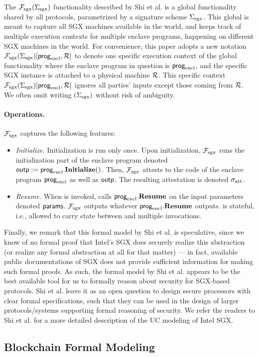The $\mathcal{F}_{\textrm{sgx}}({\Sigma_{\textrm{sgx}}})$ functionality described by Shi et al. 
is a global functionality shared by all protocols, parametrized
by a signature scheme ${\Sigma_{\textrm{sgx}}}$.
This global \fsgx 
is meant to capture all SGX machines available in the world,
and keeps track of 
multiple execution contexts
for multiple enclave programs, happening on different SGX machines in the world.
For convenience, 
this paper adopts a new notation
$\mathcal{F}_{\textrm{sgx}}({\Sigma_{\textrm{sgx}}})[{\sf prog}_{\textrm{encl}}, \mathcal{R}]$
to denote 
one specific execution context of the global \fsgx
functionality where the enclave program in question is ${\sf prog}_{\textrm{encl}}$,
and the specific SGX instance is attached to a physical machine $\mathcal{R}$.
This specific context 
$\mathcal{F}_{\textrm{sgx}}({\Sigma_{\textrm{sgx}}})[{\sf prog}_{\textrm{encl}}, \mathcal{R}]$
ignores all parties' inputs except those coming from $\mathcal{R}$.
We often omit writing $({\Sigma_{\textrm{sgx}}})$ without risk of ambiguity.


\paragraph{Operations.}
$\mathcal{F}_{\textrm{sgx}}$ captures the following features:
\begin{itemize}[leftmargin=5mm]
\item
{\it Initialize.}
Initialization is run only once.
Upon initialization, $\mathcal{F}_{\textrm{sgx}}$
runs the initialization part of the enclave program
denoted ${\sf outp} := {\sf prog}_{\textrm{encl}}.{\bf Initialize}()$.
Then, $\mathcal{F}_{\textrm{sgx}}$ 
attests to the code of the enclave program ${\sf prog}_{\textrm{encl}}$ 
as well as ${\sf outp}$.
The resulting attestation is denoted 
${\sigma_{\textrm{att}}}$.
\item
{\it Resume.}
When  is invoked,
\fsgx 
calls ${\sf prog}_{\textrm{encl}}.{\bf Resume}$
on the input parameters denoted ${\sf params}$.
$\mathcal{F}_{\textrm{sgx}}$ 
outputs whatever ${\sf prog}_{\textrm{encl}}.{\bf Resume}$ outputs.
\fsgx is stateful, i.e., allowed to carry state
between  and multiple 
invocations.
\end{itemize}

Finally, we remark that this formal model by Shi et al.
is speculative,   
since we know of no formal
proof that Intel's SGX does securely realize this abstraction (or 
realize any formal
abstraction at all for that matter) --- 
in fact, available public documentations of SGX
does not provide sufficient information for making such formal proofs. 
As such, the formal model by Shi et al. 
appears to be the best available tool for us to 
formally reason about 
security 
for SGX-based protocols. 
Shi et al. leave it as an open question to design secure processors
with clear formal specifications, such that 
they can be used in the design of larger protocols/systems 
supporting formal reasoning of security.
We refer the readers to Shi et al.   for a
more detailed description of the UC modeling of Intel SGX.


\subsection{Blockchain Formal Modeling}
\label{sec:blockchainmodel}
